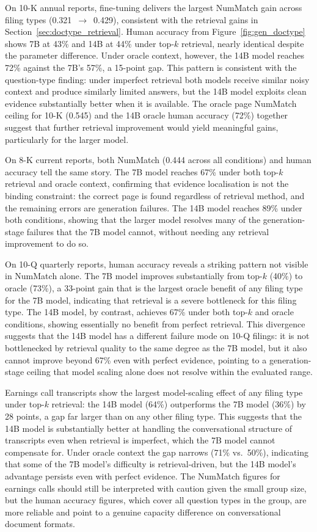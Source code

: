 \documentclass[12pt,twoside,maitrise]{dms}
\theoremstyle{definition}
\numberwithin{equation}{section}
\numberwithin{table}{chapter}
\numberwithin{figure}{chapter}
\begin{document}
On 10-K annual reports, fine-tuning delivers the largest NumMatch gain across filing
types (0.321~$\to$~0.429), consistent with the retrieval gains in
Section~\ref{sec:doctype_retrieval}. Human accuracy from Figure~\ref{fig:gen_doctype}
shows 7B at 43\% and 14B at 44\% under top-$k$ retrieval, nearly identical despite the
parameter difference. Under oracle context, however, the 14B model reaches 72\% against
the 7B's 57\%, a 15-point gap. This pattern is consistent with the question-type
finding: under imperfect retrieval both models receive similar noisy context and produce
similarly limited answers, but the 14B model exploits clean evidence substantially
better when it is available. The oracle page NumMatch ceiling for 10-K (0.545) and the
14B oracle human accuracy (72\%) together suggest that further retrieval improvement
would yield meaningful gains, particularly for the larger model.

On 8-K current reports, both NumMatch (0.444 across all conditions) and human accuracy
tell the same story. The 7B model reaches 67\% under both top-$k$ retrieval and oracle
context, confirming that evidence localisation is not the binding constraint: the
correct page is found regardless of retrieval method, and the remaining errors are
generation failures. The 14B model reaches 89\% under both conditions, showing that
the larger model resolves many of the generation-stage failures that the 7B model
cannot, without needing any retrieval improvement to do so.

On 10-Q quarterly reports, human accuracy reveals a striking pattern not visible in
NumMatch alone. The 7B model improves substantially from top-$k$ (40\%) to oracle
(73\%), a 33-point gain that is the largest oracle benefit of any filing type for the
7B model, indicating that retrieval is a severe bottleneck for this filing type.
The 14B model, by contrast, achieves 67\% under both top-$k$ and oracle conditions,
showing essentially no benefit from perfect retrieval. This divergence suggests that
the 14B model has a different failure mode on 10-Q filings: it is not bottlenecked
by retrieval quality to the same degree as the 7B model, but it also cannot improve
beyond 67\% even with perfect evidence, pointing to a generation-stage ceiling that
model scaling alone does not resolve within the evaluated range.

Earnings call transcripts show the largest model-scaling effect of any filing type
under top-$k$ retrieval: the 14B model (64\%) outperforms the 7B model (36\%) by 28
points, a gap far larger than on any other filing type. This suggests that the 14B
model is substantially better at handling the conversational structure of transcripts
even when retrieval is imperfect, which the 7B model cannot compensate for. Under
oracle context the gap narrows (71\% vs.\ 50\%), indicating that some of the 7B
model's difficulty is retrieval-driven, but the 14B model's advantage persists even
with perfect evidence. The NumMatch figures for earnings calls should still be
interpreted with caution given the small group size, but the human accuracy figures,
which cover all question types in the group, are more reliable and point to a genuine
capacity difference on conversational document formats.
\end{document}
